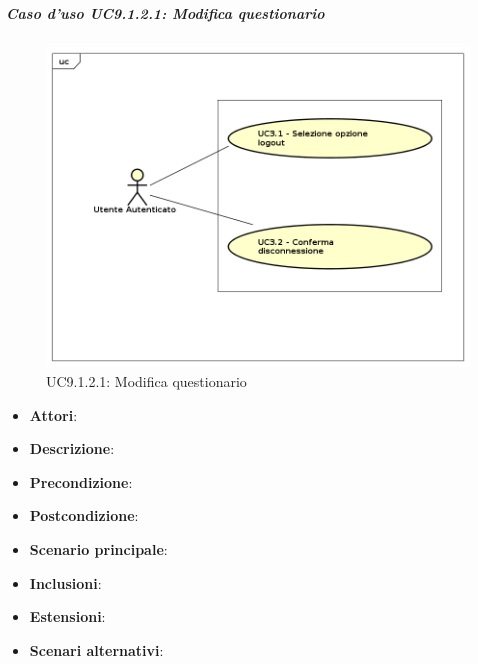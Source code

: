 			\subparagraph{Caso d'uso UC9.1.2.1: Modifica questionario}
			\label{UC9.1.2.1}
			\begin{figure}[h]
				\centering
			\includegraphics[scale=0.7,keepaspectratio]{UML/UC9.png}
				\caption{UC9.1.2.1: Modifica questionario}
			\end{figure}
			\FloatBarrier
			\begin{itemize}
				\item \textbf{Attori}: 
				\item \textbf{Descrizione}: 
				\item \textbf{Precondizione}: 
				\item \textbf{Postcondizione}: 
				\item \textbf{Scenario principale}:
				\item \textbf{Inclusioni}:
				\item \textbf{Estensioni}:
				\item \textbf{Scenari alternativi}:
			\end{itemize}
			
